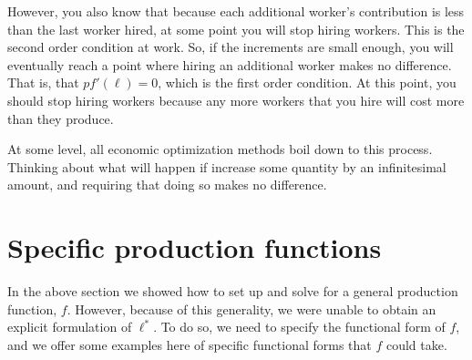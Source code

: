 However, you also know that because each additional worker's contribution is less than the last worker hired, at some point you will stop hiring workers. This is the second order condition at work. So, if the increments are small enough, you will eventually reach a point where hiring an additional worker makes no difference. That is, that $p f'(\ell) = 0$, which is the first order condition. At this point, you should stop hiring workers because any more workers that you hire will cost more than they produce. 

At some level, all economic optimization methods boil down to this process. Thinking about what will happen if increase some quantity by an infinitesimal amount, and requiring that doing so makes no difference. 

\section{Specific production functions}
In the above section we showed how to set up and solve for a general production function, $f$. However, because of this generality, we were unable to obtain an explicit formulation of $\ell^*$. To do so, we need to specify the functional form of $f$, and we offer some examples here of specific functional forms that $f$ could take.


